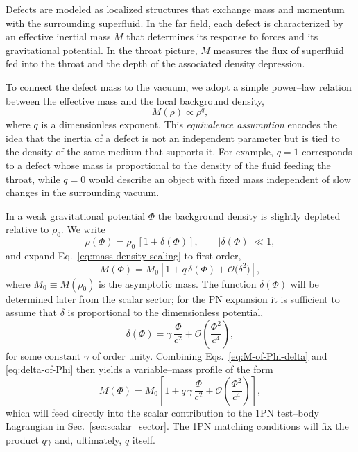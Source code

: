 \documentclass[11pt]{article}
\newcommand{\rhozero}{\rho_0}
\begin{document}
Defects are modeled as localized structures that exchange mass and momentum
with the surrounding superfluid.  In the far field, each defect is
characterized by an effective inertial mass $M$ that determines its response
to forces and its gravitational potential.  In the throat picture, $M$
measures the flux of superfluid fed into the throat and the depth of the
associated density depression.

To connect the defect mass to the vacuum, we adopt a simple power--law
relation between the effective mass and the local background density,
\begin{equation}
  M(\rho) \propto \rho^q,
  \label{eq:mass-density-scaling}
\end{equation}
where $q$ is a dimensionless exponent.  This \emph{equivalence assumption}
encodes the idea that the inertia of a defect is not an independent
parameter but is tied to the density of the same medium that supports it.
For example, $q=1$ corresponds to a defect whose mass is proportional to the
density of the fluid feeding the throat, while $q=0$ would describe an
object with fixed mass independent of slow changes in the surrounding
vacuum.

In a weak gravitational potential $\Phi$ the background density is slightly
depleted relative to $\rhozero$.  We write
\begin{equation}
  \rho(\Phi) = \rhozero\,[1 + \delta(\Phi)],
  \qquad
  |\delta(\Phi)| \ll 1,
  \label{eq:rho-of-Phi}
\end{equation}
and expand Eq.~\eqref{eq:mass-density-scaling} to first order,
\begin{equation}
  M(\Phi)
  = M_0 \left[ 1 + q\,\delta(\Phi) + \mathcal{O}\big(\delta^2\big) \right],
  \label{eq:M-of-Phi-delta}
\end{equation}
where $M_0 \equiv M(\rhozero)$ is the asymptotic mass.  The function
$\delta(\Phi)$ will be determined later from the scalar sector; for the PN
expansion it is sufficient to assume that $\delta$ is proportional to the
dimensionless potential,
\begin{equation}
  \delta(\Phi)
  = \gamma\,\frac{\Phi}{c^2}
  + \mathcal{O}\!\left(\frac{\Phi^2}{c^4}\right),
  \label{eq:delta-of-Phi}
\end{equation}
for some constant $\gamma$ of order unity.  Combining
Eqs.~\eqref{eq:M-of-Phi-delta} and \eqref{eq:delta-of-Phi} then yields a
variable--mass profile of the form
\begin{equation}
  M(\Phi)
  = M_0\left[ 1 + q\,\gamma\,\frac{\Phi}{c^2}
  + \mathcal{O}\!\left(\frac{\Phi^2}{c^4}\right) \right],
  \label{eq:M-of-Phi-linear}
\end{equation}
which will feed directly into the scalar contribution to the 1PN test--body
Lagrangian in Sec.~\ref{sec:scalar_sector}.  The 1PN matching conditions will
fix the product $q\gamma$ and, ultimately, $q$ itself.
\end{document}
